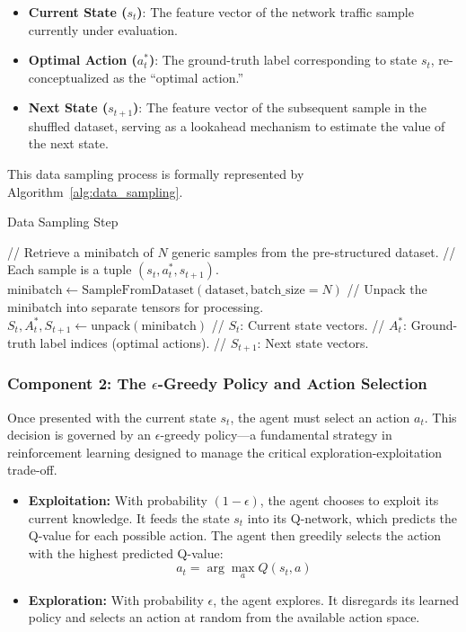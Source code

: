 \documentclass[16pt]{report}
\begin{document}
\begin{itemize}
  \item \textbf{Current State (\( s_t \))}: The feature vector of the network traffic sample currently under evaluation.
  \item \textbf{Optimal Action (\( a^*_t \))}: The ground-truth label corresponding to state \( s_t \), re-conceptualized as the “optimal action.”
  \item \textbf{Next State (\( s_{t+1} \))}: The feature vector of the subsequent sample in the shuffled dataset, serving as a lookahead mechanism to estimate the value of the next state.
\end{itemize}

This data sampling process is formally represented by Algorithm~\ref{alg:data_sampling}.

\begin{algorithm}[H]
\caption{Data Sampling Step}
\label{alg:data_sampling}
\begin{algorithmic}[1]
\State // Retrieve a minibatch of \( N \) generic samples from the pre-structured dataset.
\State // Each sample is a tuple \( (s_t, a^*_t, s_{t+1}) \).
\State \( \text{minibatch} \gets \text{SampleFromDataset}(\text{dataset}, \text{batch\_size} = N) \)
\State // Unpack the minibatch into separate tensors for processing.
\State \( S_t, A^*_t, S_{t+1} \gets \text{unpack}(\text{minibatch}) \)
\State // \( S_t \): Current state vectors.
\State // \( A^*_t \): Ground-truth label indices (optimal actions).
\State // \( S_{t+1} \): Next state vectors.
\end{algorithmic}
\end{algorithm}

\subsubsection*{Component 2: The $\epsilon$-Greedy Policy and Action Selection}

Once presented with the current state $s_t$, the agent must select an action $a_t$. This decision is governed by an $\epsilon$-greedy policy—a fundamental strategy in reinforcement learning designed to manage the critical exploration-exploitation trade-off.

\begin{itemize}
    \item \textbf{Exploitation:} With probability $(1 - \epsilon)$, the agent chooses to exploit its current knowledge. It feeds the state $s_t$ into its Q-network, which predicts the Q-value for each possible action. The agent then greedily selects the action with the highest predicted Q-value: 
    \[
    a_t = \arg\max_a Q(s_t, a)
    \]
    
    \item \textbf{Exploration:} With probability $\epsilon$, the agent explores. It disregards its learned policy and selects an action at random from the available action space.
\end{itemize}
\end{document}
